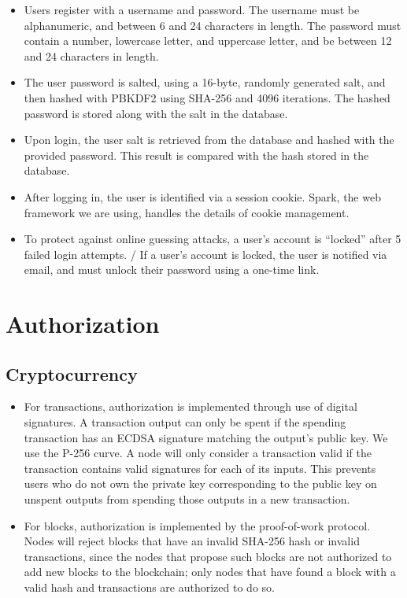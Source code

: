 \documentclass[a4paper,12pt]{article}
\begin{document}
\begin{itemize}
\item Users register with a username and password. The username must be alphanumeric, and between 6 and 24 characters in length. 
The password must contain a number, lowercase letter, and uppercase letter, and be between 12 and 24 characters in length.
\item The user password is salted, using a 16-byte, randomly generated salt, and then hashed with PBKDF2 using SHA-256 and 4096 iterations. 
The hashed password is stored along with the salt in the database.
\item Upon login, the user salt is retrieved from the database and hashed with the provided password. 
This result is compared with the hash stored in the database.
\item After logging in, the user is identified via a session cookie. 
Spark, the web framework we are using, handles the details of cookie management.
\item To protect against online guessing attacks, a user's account is ``locked'' after 5 failed login attempts. 
/%
If a user's account is locked, the user is notified via email, and must unlock their password using a one-time link.
\end{itemize}


\section{Authorization}
\subsection{Cryptocurrency}
\begin{itemize}
\item For transactions, authorization is implemented through use of digital signatures. 
A transaction output can only be spent if the spending transaction has an ECDSA signature matching the output's public key.
We use the P-256 curve.
A node will only consider a transaction valid if the transaction contains valid signatures for each of its inputs.
This prevents users who do not own the private key corresponding to the public key on unspent outputs from spending those outputs in a new transaction.
\item For blocks, authorization is implemented by the proof-of-work protocol.
Nodes will reject blocks that have an invalid SHA-256 hash or invalid transactions, since the nodes that propose such blocks are not authorized to add new blocks to the blockchain; only nodes that have found a block with a valid hash and transactions are authorized to do so.
\end{itemize}
\end{document}
